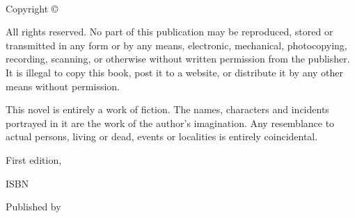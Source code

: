 
{\small
\setlength{\parindent}{0em}\setlength{\parskip}{1em}

~

\vfill

Copyright \copyright{} \copyrightyear \authorname

All rights reserved. No part of this publication may be reproduced, stored or transmitted in any form or by any means, electronic, mechanical, photocopying, recording, scanning, or otherwise without written permission from the publisher. It is illegal to copy this book, post it to a website, or distribute it by any other means without permission.

This novel is entirely a work of fiction. The names, characters and incidents portrayed in it are the work of the author’s imagination. Any resemblance to actual persons, living or dead, events or localities is entirely coincidental.

First edition, \editionyear{}

ISBN \isbn{}  %

Published by \publisher{}
}

